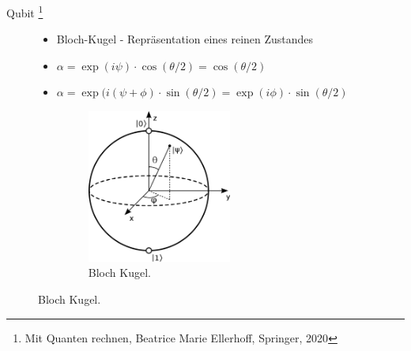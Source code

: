 \documentclass[aspectratio=1610, 9pt]{beamer}
\begin{document}
\begin{frame}{Qubit \footnote[14]{Mit Quanten rechnen, Beatrice Marie Ellerhoff, Springer, 2020}}
\begin{figure}
\begin{minipage}{0.49\textwidth}
\begin{itemize}
        \item Bloch-Kugel - Repräsentation eines reinen Zustandes
        \item[] $\alpha = \exp(i\psi) \cdot \cos(\theta/2) = \cos(\theta/2)$
        \item[] $\alpha = \exp(i(\psi+\phi) \cdot \sin(\theta/2) = \exp(i\phi) \cdot \sin(\theta/2)$
        \begin{figure}
          \includegraphics[width=0.56\textwidth]{images/Bloch.png}
          \caption{Bloch Kugel. \footnotemark[12]}
        \end{figure}
      \end{itemize}
    \end{minipage}
  \end{figure}
\end{frame}
\end{document}
